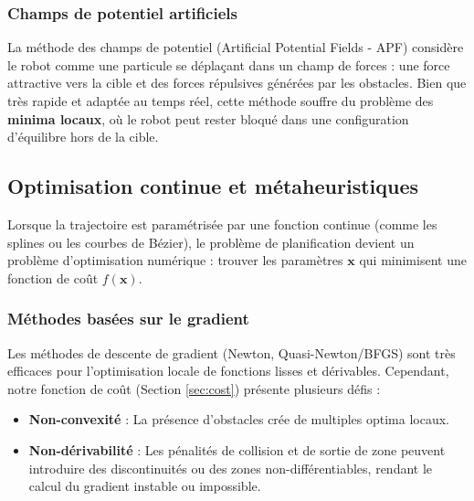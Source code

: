 \subsubsection{Champs de potentiel artificiels}
La méthode des champs de potentiel (Artificial Potential Fields - APF) \cite{khatib1986} considère le robot comme une particule se déplaçant dans un champ de forces : une force attractive vers la cible et des forces répulsives générées par les obstacles. Bien que très rapide et adaptée au temps réel, cette méthode souffre du problème des \textbf{minima locaux}, où le robot peut
rester bloqué dans une configuration d'équilibre hors de la cible.

\subsection{Optimisation continue et métaheuristiques}

Lorsque la trajectoire est paramétrisée par une fonction continue (comme les splines ou les courbes de Bézier), le problème de planification devient un problème d'optimisation numérique : trouver les paramètres $\mathbf{x}$ qui minimisent une fonction de coût $f(\mathbf{x})$.

\subsubsection{Méthodes basées sur le gradient}
Les méthodes de descente de gradient (Newton, Quasi-Newton/BFGS) sont très efficaces pour l'optimisation locale de fonctions lisses et dérivables. Cependant, notre fonction de coût (Section \ref{sec:cost}) présente plusieurs défis :
\begin{itemize}
    \item \textbf{Non-convexité} : La présence d'obstacles crée de multiples optima locaux.
    \item \textbf{Non-dérivabilité} : Les pénalités de collision et de sortie de zone peuvent introduire des discontinuités ou des zones non-différentiables, rendant le calcul du gradient instable ou impossible.
\end{itemize}

